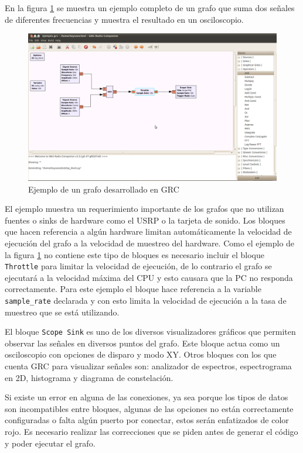 En la figura \ref{fig:grcex} se muestra un ejemplo completo de un grafo que suma dos se\~nales de
diferentes frecuencias y muestra el resultado en un osciloscopio.

\begin{figure}[tp]
  \centering
  \includegraphics[width=5.5in]{figs/grc6}
  \vspace{0.1in}
  \caption{Ejemplo de un grafo desarrollado en GRC}
  \label{fig:grcex}
\end{figure}

El ejemplo muestra un requerimiento importante de los grafos que no utilizan fuentes o sinks de
hardware como el USRP o la tarjeta de sonido. Los bloques que hacen referencia a alg\'un hardware
limitan autom\'aticamente la velocidad de ejecuci\'on del grafo a la velocidad de muestreo del
hardware. Como el ejemplo de la figura \ref{fig:grcex} no contiene este tipo de bloques es
necesario incluir el bloque \verb|Throttle| para limitar la velocidad de ejecuci\'on, de lo
contrario el grafo se ejecutar\'a a la velocidad m\'axima del CPU y esto causara que la PC no
responda correctamente. Para este ejemplo el bloque hace referencia a la variable \verb|sample_rate|
declarada y con esto limita la velocidad de ejecuci\'on a la tasa de muestreo que se est\'a utilizando.

El bloque \verb|Scope Sink| es uno de los diversos visualizadores gr\'aficos que permiten observar las
se\~nales en diversos puntos del grafo. Este bloque actua como un osciloscopio con opciones de
disparo y modo XY. Otros bloques con los que cuenta GRC para visualizar se\~nales son: analizador de
espectros, espectrograma en 2D, histograma y diagrama de constelaci\'on.

Si existe un error en alguna de las conexiones, ya sea porque los tipos de datos son incompatibles
entre bloques, algunas de las opciones no est\'an correctamente configuradas o falta alg\'un puerto
por conectar, estos ser\'an enfatizados de color rojo. Es necesario realizar las correcciones que se
piden antes de generar el c\'odigo y poder ejecutar el grafo.

